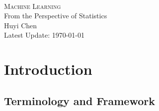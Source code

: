 \documentclass{report}
\theoremstyle{nonumberplain}
\newcommand{\0}{\mathbf{0}}
\begin{document}
	\begin{center}	
	~\\ 
	\vspace{6em} 
	\textsc{\Huge Machine Learning}	
	~\\
	\vspace{2.5em} 
	{\Large From the Perspective of Statistics}
	~\\
	\vspace{6em}
	\textsf{Huyi Chen}
	~\\
	\vspace{5in}  
	{\large Latest Update: \today}
	\end{center}

\chapter{Introduction}

\section{Terminology and Framework}
\end{document}
